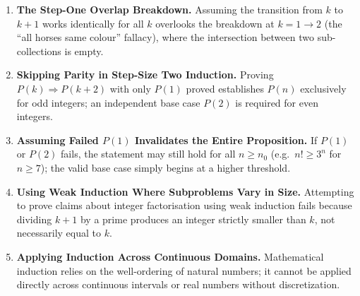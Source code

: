 \documentclass[11pt,a4paper]{article}
\begin{document}
\begin{enumerate}[leftmargin=2em, itemsep=4pt]
  \item \textbf{The Step-One Overlap Breakdown.}
        Assuming the transition from $k$ to $k+1$ works identically for all $k$ overlooks the breakdown at $k=1\to2$ (the ``all horses same colour'' fallacy), where the intersection between two sub-collections is empty. 
  \item \textbf{Skipping Parity in Step-Size Two Induction.}
        Proving $P(k)\Rightarrow P(k+2)$ with only $P(1)$ proved establishes $P(n)$ exclusively for odd integers; an independent base case $P(2)$ is required for even integers. 
  \item \textbf{Assuming Failed $P(1)$ Invalidates the Entire Proposition.}
        If $P(1)$ or $P(2)$ fails, the statement may still hold for all $n\ge n_0$ (e.g.\ $n!\ge 3^n$ for $n\ge7$); the valid base case simply begins at a higher threshold. 
  \item \textbf{Using Weak Induction Where Subproblems Vary in Size.}
        Attempting to prove claims about integer factorisation using weak induction fails because dividing $k+1$ by a prime produces an integer strictly smaller than $k$, not necessarily equal to $k$. 
  \item \textbf{Applying Induction Across Continuous Domains.}
        Mathematical induction relies on the well-ordering of natural numbers; it cannot be applied directly across continuous intervals or real numbers without discretization. 
\end{enumerate}

\end{document}
